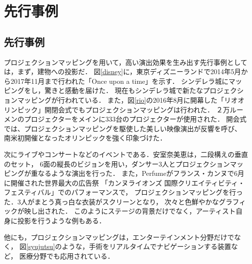 \chapter{先行事例}
\thispagestyle{fancy}

\section{先行事例}
プロジェクションマッピングを用いて，高い演出効果を生み出す先行事例としては，まず，建物への投影だ．
図\ref{disney}に，東京ディズニーランドで2014年5月から2017年11月まで行われた「Once upon a time」を示す\cite{disney}．
シンデレラ城にマッピングをし，驚きと感動を届けた．
現在もシンデレラ城で新たなプロジェクションマッピングが行われている\cite{once}．
また，図\ref{rio}の2016年8月に開幕した「リオオリンピック」開閉会式でもプロジェクションマッピングは行われた． 
２万ルーメンのプロジェクターをメインに333台のプロジェクターが使用された．
開会式では、プロジェクションマッピングを駆使した美しい映像演出が反響を呼び、
南米初開催となったオリンピックを強く印象づけた\cite{olympic}．

次にライブやコンサートなどのイベントである．安室奈美恵は，二段構えの垂直のセット，
6面の縦長のビジョンを用い，ダンサー3人とプロジェクションマッピングが重なるような演出を行った\cite{amuro}．
また，Perfumeがフランス・カンヌで6月に開催された世界最大の広告祭
「カンヌライオンズ 国際クリエイティビティ・フェスティバル」でのパフォーマンスで，
プロジェクションマッピングを行った．3人がまとう真っ白な衣装がスクリーンとなり，
次々と色鮮やかなグラフィックが映し出された\cite{kirameku}．
このようにステージの背景だけでなく，アーティスト自身に投影を行うような例もある．

他にも，プロジェクションマッピングは，エンターテインメント分野だけでなく，
図\ref{syujutsu}のような，手術をリアルタイムでナビゲーションする装置\cite{iryou}など，
医療分野でも応用されている．


\clearpage

